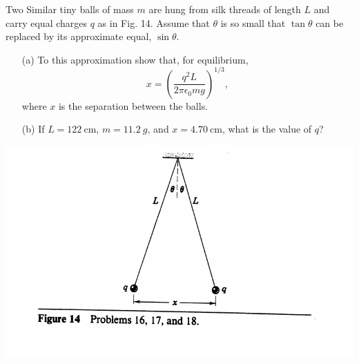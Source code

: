 \documentclass[12pt,letterpaper,boxed,cm]{hmcpset}
\newcommand{\f}[2]{\frac{#1}{#2}}
\newcommand{\pn}[1]{\left( #1 \right)}
\begin{document}

\begin{problem}[25-P4]
  Two Similar tiny balls of mass $m$ are hung from silk threads of length $L$
  and carry equal charges $q$ as in Fig. 14. Assume that $\theta$ is so small
  that $\tan\theta$ can be replaced by its approximate equal, $\sin\theta$.
  \begin{enumerate}
    \item[(a)] To this approximation show that, for equilibrium,
  \[
    x = \pn{\f{q^2L}{2\pi\epsilon_0mg}}^{1/3},
  \]
  where $x$ is the separation between the balls.
  \item[(b)] If $L = \SI{122}{\cm}$, $m =
  \SI{11.2}{g}$, and $x = \SI{4.70}{\cm}$, what is the value of $q$?
  \end{enumerate}
  \begin{center}
    \includegraphics[scale=0.7]{01.png}
  \end{center}
\end{problem}
\begin{solution}
\end{solution}
\newpage
\end{document}

